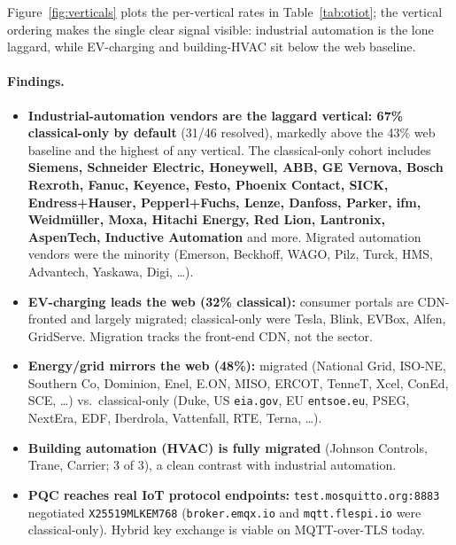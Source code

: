 \documentclass[11pt]{article}
\newcommand{\code}[1]{\texttt{#1}}
\begin{document}
Figure~\ref{fig:verticals} plots the per-vertical rates in
Table~\ref{tab:otiot}; the vertical ordering makes the single clear signal
visible: industrial automation is the lone laggard, while EV-charging and
building-HVAC sit below the web baseline.

\paragraph{Findings.}
\begin{itemize}
  \item \textbf{Industrial-automation vendors are the laggard vertical: 67\%
        classical-only by default} (31/46 resolved), markedly above the 43\% web
        baseline and the highest of any vertical. The classical-only cohort includes
        \textbf{Siemens, Schneider Electric, Honeywell, ABB, GE Vernova, Bosch Rexroth,
        Fanuc, Keyence, Festo, Phoenix Contact, SICK, Endress+Hauser, Pepperl+Fuchs,
        Lenze, Danfoss, Parker, ifm, Weidm\"uller, Moxa, Hitachi Energy, Red Lion,
        Lantronix, AspenTech, Inductive Automation} and more. Migrated automation
        vendors were the minority (Emerson, Beckhoff, WAGO, Pilz, Turck, HMS, Advantech,
        Yaskawa, Digi, \ldots).
  \item \textbf{EV-charging leads the web (32\% classical):} consumer portals are
        CDN-fronted and largely migrated; classical-only were Tesla, Blink, EVBox,
        Alfen, GridServe. Migration tracks the front-end CDN, not the sector.
  \item \textbf{Energy/grid mirrors the web (48\%):} migrated (National Grid, ISO-NE,
        Southern Co, Dominion, Enel, E.ON, MISO, ERCOT, TenneT, Xcel, ConEd, SCE,
        \ldots) vs.\ classical-only (Duke, US \code{eia.gov}, EU \code{entsoe.eu},
        PSEG, NextEra, EDF, Iberdrola, Vattenfall, RTE, Terna, \ldots).
  \item \textbf{Building automation (HVAC) is fully migrated} (Johnson Controls, Trane,
        Carrier; 3 of 3), a clean contrast with industrial automation.
  \item \textbf{PQC reaches real IoT protocol endpoints:}
        \code{test.mosquitto.org:8883} negotiated \code{X25519MLKEM768}
        (\code{broker.emqx.io} and \code{mqtt.flespi.io} were classical-only). Hybrid
        key exchange is viable on MQTT-over-TLS today.
\end{itemize}
\end{document}
